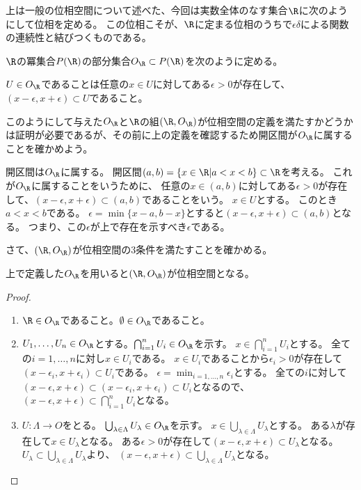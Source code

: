 \documentclass[uplatex]{jsarticle}
\begin{document}
上は一般の位相空間について述べた、今回は実数全体のなす集合$\R$に次のようにして位相を定める。
この位相こそが、$\R$に定まる位相のうちで$\epsilon\delta$による関数の連続性と結びつくものである。

\begin{dfn}[実数の位相]
  $\R$の冪集合$P(\R)$の部分集合$O_\R\subset P(\R)$を次のように定める。
  
  $U\in O_\R$であることは任意の$x\in U$に対してある$\epsilon>0$が存在して、
  $(x-\epsilon,x+\epsilon)\subset U$であること。
\end{dfn}

このようにして与えた$O_\R$と$\R$の組$(\R,O_\R)$が位相空間の定義を満たすかどうかは証明が必要であるが、その前に上の定義を確認するため開区間が$O_\R$に属することを確かめよう。

\begin{eg}
  開区間は$O_\R$に属する。
  開区間$(a,b)=\{x\in\R\vert a<x<b\}\subset\R$を考える。
  これが$O_\R$に属することをいうために、
  任意の$x\in (a,b)$に対してある$\epsilon>0$が存在して、$(x-\epsilon,x+\epsilon)\subset(a,b)$であることをいう。
  $x\in U$とする。
  このとき$a<x<b$である。
  $\epsilon=\min\{x-a,b-x\}$とすると$(x-\epsilon,x+\epsilon)\subset(a,b)$となる。
  つまり、この$\epsilon$が上で存在を示すべき$\epsilon$である。
\end{eg}

さて、$(\R,O_\R)$が位相空間の$3$条件を満たすことを確かめる。

\begin{prop}
  上で定義した$O_\R$を用いると$(\R,O_\R)$が位相空間となる。
\end{prop}

\begin{proof}
  \begin{enumerate}
  \item $\R\in O_\R$であること。$\emptyset\in O_\R$であること。
  \item $U_1,\ldots,U_n\in O_\R$とする。$\bigcap_{i=1}^nU_i\in O_\R$を示す。
    $x\in\bigcap_{i=1}^nU_i$とする。
    全ての$i=1,\ldots,n$に対し$x\in U_i$である。
    $x\in U_i$であることから$\epsilon_i>0$が存在して$(x-\epsilon_i,x+\epsilon_i)\subset U_i$である。
    $\epsilon=\min_{i=1,\ldots,n}\epsilon_i$とする。
    全ての$i$に対して$(x-\epsilon,x+\epsilon)\subset(x-\epsilon_i,x+\epsilon_i)\subset U_i$となるので、$(x-\epsilon,x+\epsilon)\subset\bigcap_{i=1}^nU_i$となる。
  \item
    $U:\Lambda\to O$をとる。
    $\bigcup_{\lambda\in\Lambda}U_\lambda\in O_\R$を示す。
    $x\in\bigcup_{\lambda\in\Lambda}U_\lambda$とする。
    ある$\lambda$が存在して$x\in U_\lambda$となる。
    ある$\epsilon>0$が存在して$(x-\epsilon,x+\epsilon)\subset U_\lambda$となる。
    $U_\lambda\subset\bigcup_{\lambda\in\Lambda}U_\lambda$より、
    $(x-\epsilon,x+\epsilon)\subset\bigcup_{\lambda\in\Lambda}U_\lambda$となる。
  \end{enumerate}  
\end{proof}
\end{document}

